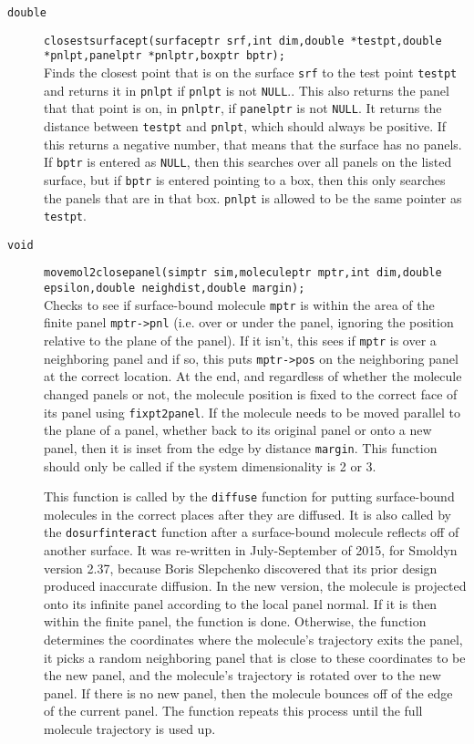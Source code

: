 \documentclass {book}
\begin{document}
\begin{description}
\item[\texttt{double}]
\texttt{closestsurfacept(surfaceptr srf,int dim,double *testpt,double *pnlpt,panelptr *pnlptr,boxptr bptr);}
\hfill \\
Finds the closest point that is on the surface \texttt{srf} to the test point \texttt{testpt} and returns it in \texttt{pnlpt} if \texttt{pnlpt} is not \texttt{NULL}.. This also returns the panel that that point is on, in \texttt{pnlptr}, if \texttt{panelptr} is not \texttt{NULL}. It returns the distance between \texttt{testpt} and \texttt{pnlpt}, which should always be positive. If this returns a negative number, that means that the surface has no panels. If \texttt{bptr} is entered as \texttt{NULL}, then this searches over all panels on the listed surface, but if \texttt{bptr} is entered pointing to a box, then this only searches the panels that are in that box. \texttt{pnlpt} is allowed to be the same pointer as \texttt{testpt}.

\item[\texttt{void}]
\texttt{movemol2closepanel(simptr sim,moleculeptr mptr,int dim,double epsilon,double neighdist,double margin);}
\hfill \\
Checks to see if surface-bound molecule \texttt{mptr} is within the area of the finite panel \texttt{mptr->pnl} (i.e. over or under the panel, ignoring the position relative to the plane of the panel). If it isn't, this sees if \texttt{mptr} is over a neighboring panel and if so, this puts \texttt{mptr->pos} on the neighboring panel at the correct location. At the end, and regardless of whether the molecule changed panels or not, the molecule position is fixed to the correct face of its panel using \texttt{fixpt2panel}. If the molecule needs to be moved parallel to the plane of a panel, whether back to its original panel or onto a new panel, then it is inset from the edge by distance \texttt{margin}. This function should only be called if the system dimensionality is 2 or 3.

This function is called by the \texttt{diffuse} function for putting surface-bound molecules in the correct places after they are diffused. It is also called by the \texttt{dosurfinteract} function after a surface-bound molecule reflects off of another surface. It was re-written in July-September of 2015, for Smoldyn version 2.37, because Boris Slepchenko discovered that its prior design produced inaccurate diffusion. In the new version, the molecule is projected onto its infinite panel according to the local panel normal. If it is then within the finite panel, the function is done. Otherwise, the function determines the coordinates where the molecule's trajectory exits the panel, it picks a random neighboring panel that is close to these coordinates to be the new panel, and the molecule's trajectory is rotated over to the new panel. If there is no new panel, then the molecule bounces off of the edge of the current panel. The function repeats this process until the full molecule trajectory is used up.


\end{description}
\end{document}
